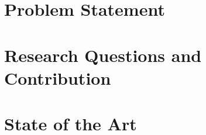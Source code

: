 \section{Problem Statement}
%


\section{Research Questions and Contribution}
%


\section{State of the Art}
%


